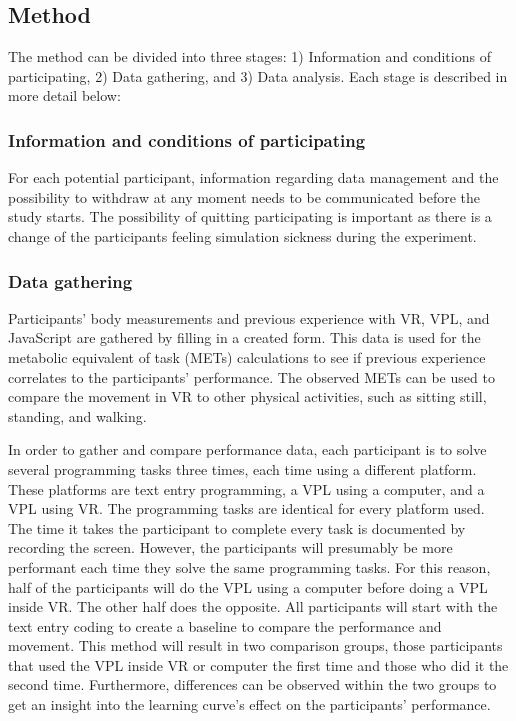 \documentclass{sigchi}
\begin{document}
\subsection{Method}
The method can be divided into three stages: 1) Information and conditions of participating, 2) Data gathering, and 3) Data analysis. Each stage is described in more detail below:

\subsubsection{Information and conditions of participating}
For each potential participant, information regarding data management and the possibility to withdraw at any moment needs to be communicated before the study starts. The possibility of quitting participating is important as there is a change of the participants feeling simulation sickness during the experiment.

\subsubsection{Data gathering}
Participants' body measurements and previous experience with VR, VPL, and JavaScript are gathered by filling in a created form. This data is used for the metabolic equivalent of task (METs) calculations to see if previous experience correlates to the participants' performance. The observed METs can be used to compare the movement in VR to other physical activities, such as sitting still, standing, and walking.

In order to gather and compare performance data, each participant is to solve several programming tasks three times, each time using a different platform. These platforms are text entry programming, a VPL using a computer, and a VPL using VR. The programming tasks are identical for every platform used. The time it takes the participant to complete every task is documented by recording the screen. However, the participants will presumably be more performant each time they solve the same programming tasks. For this reason, half of the participants will do the VPL using a computer before doing a VPL inside VR. The other half does the opposite. All participants will start with the text entry coding to create a baseline to compare the performance and movement. This method will result in two comparison groups, those participants that used the VPL inside VR or computer the first time and those who did it the second time. Furthermore, differences can be observed within the two groups to get an insight into the learning curve's effect on the participants' performance.
\end{document}
